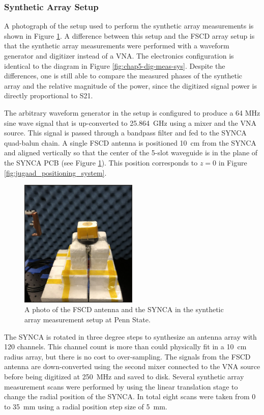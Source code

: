 \subsubsection{Synthetic Array Setup}

A photograph of the setup used to perform the synthetic array measurements is shown in Figure \ref{fig:synth_array_photo}. A difference between this setup and the FSCD array setup is that the synthetic array measurements were performed with a waveform generator and digitizer instead of a VNA. The electronics configuration is identical to the diagram in Figure \ref{fig:chap5-dig-meas-sys}. Despite the differences, one is still able to compare the measured phases of the synthetic array and the relative magnitude of the power, since the digitized signal power is directly proportional to S21. 

The arbitrary waveform generator in the setup is configured to produce a 64 MHz sine wave signal that is up-converted to 25.864~GHz using a mixer and the VNA source. This signal is passed through a bandpass filter and fed to the SYNCA quad-balun chain. A single FSCD antenna is positioned 10~cm from the SYNCA and aligned vertically so that the center of the 5-slot waveguide is in the plane of the SYNCA PCB (see Figure \ref{fig:synth_array_photo}). This position corresponds to $z=0$ in Figure \ref{fig:jugaad_positioning_system}. 
\begin{figure}[htbp]
    \centering
    \includegraphics[width=0.5\textwidth]{figs/Chapter-5/230412_IMG_2756.png}
    \caption{A photo of the FSCD antenna and the SYNCA in the synthetic array measurement setup at Penn State.}
    \label{fig:synth_array_photo}
\end{figure}
The SYNCA is rotated in three degree steps to synthesize an antenna array with 120 channels. This channel count is more than could physically fit in a 10~cm radius array, but there is no cost to over-sampling. The signals from the FSCD antenna are down-converted using the second mixer connected to the VNA source before being digitized at 250~MHz and saved to disk. Several synthetic array measurement scans were performed by using the linear translation stage to change the radial position of the SYNCA. In total eight scans were taken from 0 to 35~mm using a radial position step size of 5~mm.

